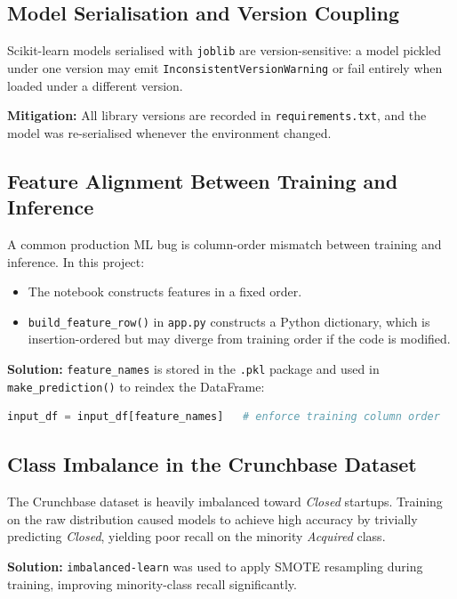 \documentclass[12pt,a4paper]{article}
\begin{document}
\subsection{Model Serialisation and Version Coupling}

Scikit-learn models serialised with \texttt{joblib} are version-sensitive: a model
pickled under one version may emit \texttt{InconsistentVersionWarning} or fail
entirely when loaded under a different version.

\textbf{Mitigation:} All library versions are recorded in \texttt{requirements.txt},
and the model was re-serialised whenever the environment changed.

\subsection{Feature Alignment Between Training and Inference}

A common production ML bug is column-order mismatch between training and inference.
In this project:
\begin{itemize}[leftmargin=1.5em]
    \item The notebook constructs features in a fixed order.
    \item \texttt{build\_feature\_row()} in \texttt{app.py} constructs a Python
          dictionary, which is insertion-ordered but may diverge from training order
          if the code is modified.
\end{itemize}

\textbf{Solution:} \texttt{feature\_names} is stored in the \texttt{.pkl} package
and used in \texttt{make\_prediction()} to reindex the DataFrame:
\begin{lstlisting}[language=Python]
input_df = input_df[feature_names]   # enforce training column order
\end{lstlisting}

\subsection{Class Imbalance in the Crunchbase Dataset}

The Crunchbase dataset is heavily imbalanced toward \textit{Closed} startups.
Training on the raw distribution caused models to achieve high accuracy by
trivially predicting \textit{Closed}, yielding poor recall on the minority
\textit{Acquired} class.

\textbf{Solution:} \texttt{imbalanced-learn} was used to apply SMOTE resampling
during training, improving minority-class recall significantly.
\end{document}
